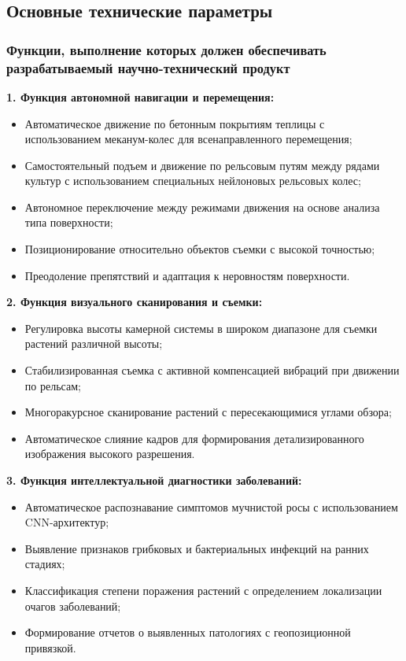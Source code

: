 \documentclass[12pt,a4paper]{article}
\begin{document}
\subsection{Основные технические параметры}

\subsubsection{Функции, выполнение которых должен обеспечивать разрабатываемый научно-технический продукт}

\textbf{1. Функция автономной навигации и перемещения:}
\begin{itemize}
\item Автоматическое движение по бетонным покрытиям теплицы с использованием меканум-колес для всенаправленного перемещения;
\item Самостоятельный подъем и движение по рельсовым путям между рядами культур с использованием специальных нейлоновых рельсовых колес;
\item Автономное переключение между режимами движения на основе анализа типа поверхности;
\item Позиционирование относительно объектов съемки с высокой точностью;
\item Преодоление препятствий и адаптация к неровностям поверхности.
\end{itemize}

\textbf{2. Функция визуального сканирования и съемки:}
\begin{itemize}
\item Регулировка высоты камерной системы в широком диапазоне для съемки растений различной высоты;
\item Стабилизированная съемка с активной компенсацией вибраций при движении по рельсам;
\item Многоракурсное сканирование растений с пересекающимися углами обзора;
\item Автоматическое слияние кадров для формирования детализированного изображения высокого разрешения.
\end{itemize}

\textbf{3. Функция интеллектуальной диагностики заболеваний:}
\begin{itemize}
\item Автоматическое распознавание симптомов мучнистой росы с использованием CNN-архитектур;
\item Выявление признаков грибковых и бактериальных инфекций на ранних стадиях;
\item Классификация степени поражения растений с определением локализации очагов заболеваний;
\item Формирование отчетов о выявленных патологиях с геопозиционной привязкой.
\end{itemize}
\end{document}
